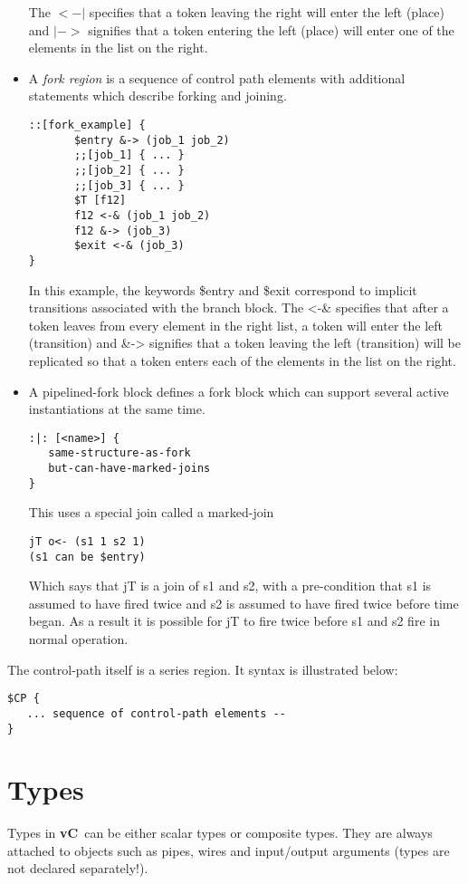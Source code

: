 \documentclass{article}
\newcommand{\vC}{{\bf vC}~}
\begin{document}
\begin{itemize}
The $<-|$ specifies that a token leaving the right will enter
the left (place) and $|->$ signifies that a token entering the left
(place) will enter one of the elements in the list on the right.
\item A {\em fork region} is a sequence of control path
elements with additional statements which describe 
forking and joining.
\begin{verbatim}
::[fork_example] {
       $entry &-> (job_1 job_2)
       ;;[job_1] { ... }
       ;;[job_2] { ... }
       ;;[job_3] { ... }
       $T [f12]
       f12 <-& (job_1 job_2)
       f12 &-> (job_3)
       $exit <-& (job_3)
}
\end{verbatim}
In this example, the keywords \$entry and \$exit correspond
to implicit transitions associated with the branch block.
The <-\& specifies that after a token leaves from every
element in the right list, a token will enter
the left (transition) and \&-> signifies that a token leaving the left
(transition) will be replicated so that a
token enters each of the elements in the list on the right.
\item A pipelined-fork block defines a fork block which can support
several active instantiations at the same time.
\begin{verbatim}
:|: [<name>] {
   same-structure-as-fork
   but-can-have-marked-joins
}
\end{verbatim}
This uses a special join called a marked-join
\begin{verbatim}
jT o<- (s1 1 s2 1)
(s1 can be $entry)
\end{verbatim}
Which says that jT is a join of s1 and s2, with a pre-condition
that s1 is assumed to have fired twice and s2 is assumed to have fired
twice before time began.  As a result it is possible for jT to fire
twice before s1 and s2 fire in normal operation. 
\end{itemize}

The control-path itself is a series region. It syntax is
illustrated below:
\begin{verbatim}
$CP {
   ... sequence of control-path elements --
}
\end{verbatim}

\section{Types} \label{sec:Types}

Types in \vC can be either scalar types or composite types.  They
are always attached to objects such as pipes, wires and input/output
arguments (types are not declared separately!).
\end{document}
